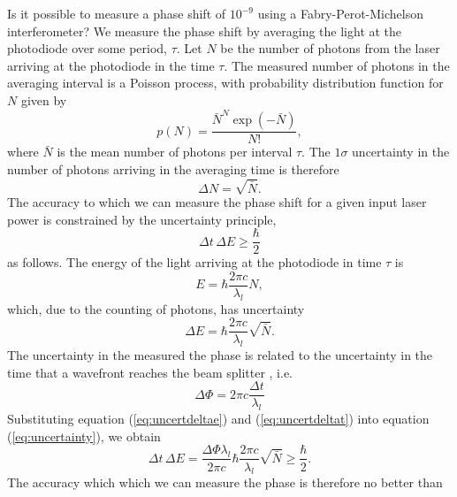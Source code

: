 Is it possible to measure a phase shift of $10^{-9}$ using a
Fabry-Perot-Michelson interferometer? We measure the phase shift by averaging
the light at the photodiode over some period, $\tau$. Let $N$ be the number of
photons from the laser arriving at the photodiode in the time $\tau$. The
measured number of photons in the averaging interval is a Poisson process,
with probability distribution function for $N$ given by
\begin{equation}
p(N) = \frac{ \bar{N} ^{N} \exp \left(-\bar{N}\right) } {N!},
\end{equation}
where $\bar{N}$ is the mean number of photons per interval $\tau$.
The $1\sigma$ uncertainty in the number of photons arriving in the averaging
time is therefore
\begin{equation}
\Delta N = \sqrt{\bar{N}}.
\end{equation}
The accuracy to which we can measure the phase shift for a given input
laser power is constrained by the uncertainty principle,
\begin{equation}
\Delta t \, \Delta E \ge \frac{\hbar}{2}
\label{eq:uncertainty}
\end{equation}
as follows. The energy of the light arriving at the photodiode in time $\tau$ is
\begin{equation}
E = \hbar \frac{2\pi c}{\lambda_l} N,
\end{equation}
which, due to the counting of photons, has uncertainty 
\begin{equation}
\Delta E = \hbar \frac{2\pi c}{\lambda_l} \sqrt{\bar{N}}.
\label{eq:uncertdeltae}
\end{equation}
The uncertainty in the measured the phase is related to the uncertainty
in the time that a wavefront reaches the beam splitter , i.e.
\begin{equation}
\Delta\Phi = 2\pi c \frac{\Delta t }{ \lambda_l }
\label{eq:uncertdeltat}
\end{equation}
Substituting equation (\ref{eq:uncertdeltae}) and (\ref{eq:uncertdeltat})
into equation (\ref{eq:uncertainty}), we obtain
\begin{equation}
\Delta t \, \Delta E = \frac{\Delta \Phi \lambda_l}{2\pi c} \hbar \frac{2\pi
c}{\lambda_l} \sqrt{\bar{N}} \ge \frac{\hbar}{2}.
\end{equation}
The accuracy which which we can measure the phase is therefore no better than
